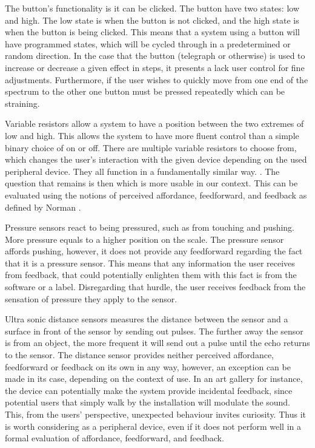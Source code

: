The button's functionality is it can be clicked. The button have two states: low and high. The low state is when the button is not clicked, and the high state is when the button is being clicked. This means that a system using a button will have programmed states, which will be cycled through in a predetermined or random direction. In the case that the button (telegraph or otherwise) is used to increase or decrease a given effect in steps, it presents a lack user control for fine adjustments. Furthermore, if the user wishes to quickly move from one end of the spectrum to the other one button must be pressed repeatedly which can be straining.

Variable resistors allow a system to have a position between the two extremes of low and high. This allows the system to have more fluent control than a simple binary choice of on or off. There are multiple variable resistors to choose from, which changes the user's interaction with the given device depending on the used peripheral device.  They all function in a fundamentally similar way. . The question that remains is then which is more usable in our context. This can be evaluated using the notions of perceived affordance, feedforward, and feedback as defined by Norman \cite{Norman:1999:ACD:301153.301168}.

Pressure sensors react to being pressured, such as from touching and pushing. More pressure equals to a higher position on the scale. The pressure sensor affords pushing, however, it does not provide any feedforward regarding the fact that it is a pressure sensor. This means that any information the user receives from feedback, that could potentially enlighten them with this fact is from the software or a label. Disregarding that hurdle, the user receives feedback from the sensation of pressure they apply to the sensor. 

Ultra sonic distance sensors measures the distance between the sensor and a surface in front of the sensor by sending out pulses. The further away the sensor is from an object, the more frequent it will send out a pulse until the echo returns to the sensor. The distance sensor provides neither perceived affordance, feedforward or feedback on its own in any way, however, an exception can be made in its case, depending on the context of use. In an art gallery for instance, the device can potentially make the system provide incidental feedback, since potential users that simply walk by the installation will modulate the sound. This, from the users' perspective, unexpected behaviour invites curiosity. Thus it is worth considering as a peripheral device, even if it does not perform well in a formal evaluation of affordance, feedforward, and feedback.

